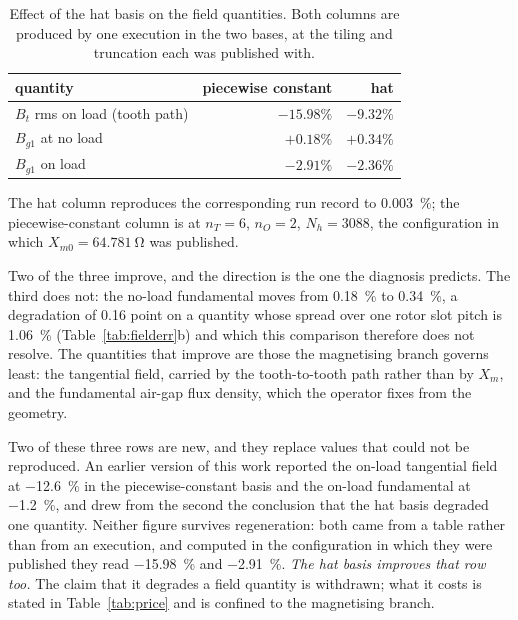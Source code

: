 \documentclass[10pt,a4paper,twocolumn]{article}
\theoremstyle{plain}
\theoremstyle{remark}
\begin{document}
\begin{table}[!ht]
\centering
\begin{threeparttable}
\footnotesize
\begin{tabular}{lrr}
\toprule
quantity & piecewise constant & hat \\
\midrule
$B_t$ rms on load (tooth path)    & $-15.98\%$ & $\bm{-9.32\%}$\\
$B_{g1}$ at no load               & $+0.18\%$  & $+0.34\%$\\
$B_{g1}$ on load                  & $-2.91\%$  & $\bm{-2.36\%}$\\
\bottomrule
\end{tabular}
\begin{tablenotes}[flushleft]\footnotesize
\item The hat
column reproduces the corresponding run record to \SI{0.003}{\percent}; the
piecewise-constant column is at $n_T=6$, $n_O=2$, $N_h=\num{3088}$, the
configuration in which $X_{m0}=\SI{64.781}{\ohm}$ was published.
\end{tablenotes}
\end{threeparttable}
\caption{Effect of the hat basis on the field quantities. Both columns
are produced by one execution in the two bases, at the tiling and
truncation each was published with.}
\label{tab:balance}
\end{table}

Two of the three improve, and the direction is the one the diagnosis
predicts. The third does not: the no-load fundamental moves from
\SI{+0.18}{\percent} to \SI{+0.34}{\percent}, a degradation of
\num{0.16} point on a quantity whose spread over one rotor slot pitch is
\SI{1.06}{\percent} (Table~\ref{tab:fielderr}b) and which this
comparison therefore does not resolve. The quantities that improve are those the
magnetising branch governs least: the tangential field, carried by the
tooth-to-tooth path rather than by $X_m$, and the fundamental air-gap
flux density, which the operator fixes from the geometry.

Two of these three rows are new, and they replace values that could not
be reproduced. An earlier version of this work reported the on-load
tangential field at \SI{-12.6}{\percent} in the piecewise-constant basis
and the on-load fundamental at \SI{-1.2}{\percent}, and drew from the
second the conclusion that the hat basis degraded one quantity. Neither
figure survives regeneration: both came from a table rather than from an
execution, and computed in the configuration in which they were
published they read \SI{-15.98}{\percent} and \SI{-2.91}{\percent}.
\emph{The hat basis improves that row too.} The claim that it degrades a
field quantity is withdrawn; what it costs is stated in
Table~\ref{tab:price} and is confined to the magnetising branch.
\end{document}
